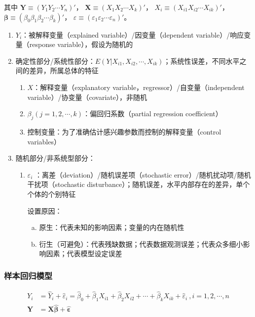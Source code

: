 \documentclass[12pt]{book}
\begin{document}
其中
$\bm{Y}\equiv (Y_{1} Y_{2} \cdots  Y_{n})'$，
$\bm{X}\equiv (X_{1} X_{2} \cdots X_{k})'$，
$X_{i}\equiv (X_{i1} X_{i2} ⋯ X_{ik})'$，
$\bm{\beta}\equiv (\beta_{0} \beta_{1} \beta_{2} \cdots \beta_{k})'$，
$\varepsilon \equiv (\varepsilon_{1} \varepsilon_{2} \cdots \varepsilon_{n})'$。

\begin{enumerate}[1.]
    \item $Y_i$：被解释变量（explained variable）/因变量（dependent variable）/响应变量（response variable），假设为随机的
    \item 确定性部分/系统性部分：$E(Y|X_{i1},X_{i2},\cdots,X_{ik})$；系统性误差，不同水平之间的差异，所属总体的特征
    \begin{enumerate}[(1)]
        \item $X$：解释变量（explanatory variable，regressor）/自变量（independent variable）/协变量（covariate），非随机
        \item $\beta_j(j=1,2,⋯,k)$：偏回归系数（partial regression coefficient） 
        \item 控制变量：为了准确估计感兴趣参数而控制的解释变量（control variables）
    \end{enumerate}
    \item 随机部分/非系统型部分：
    \begin{enumerate}[(1)]
        \item $\varepsilon_i$ ：离差（deviation）/随机误差项（stochastic error）/随机扰动项/随机干扰项（stochastic disturbance）；随机误差，水平内部存在的差异，单个个体的个别特征
        \par 设置原因：
    \begin{enumerate}[a.] 
        \item 原生：代表未知的影响因素；变量的内在随机性  
        \item 衍生（可避免）：代表残缺数据；代表数据观测误差；代表众多细小影响因素；代表模型设定误差
    \end{enumerate}
    \end{enumerate}
\end{enumerate}




\subsubsection{样本回归模型}

\begin{align*}
Y_i & ={\hat{Y}}_i+{\hat{\varepsilon}}_i ={\hat{\beta}}_0+{\hat{\beta}}_1X_{i1}+{\hat{\beta}}_2X_{i2}+\cdots+{\hat{\beta}}_kX_{ik}+{\hat{\varepsilon}}_i\ , i=1,2,\cdots,n \\  
\mathbf{Y}&=\mathbf{X}\hat{\bm{\beta}}+\hat{\bm{\varepsilon}}
\end{align*}
\end{document}
